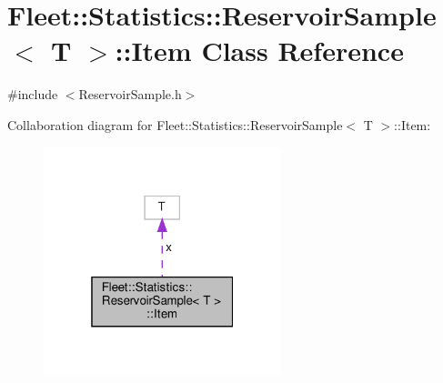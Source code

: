 \hypertarget{class_fleet_1_1_statistics_1_1_reservoir_sample_1_1_item}{}\section{Fleet\+:\+:Statistics\+:\+:Reservoir\+Sample$<$ T $>$\+:\+:Item Class Reference}
\label{class_fleet_1_1_statistics_1_1_reservoir_sample_1_1_item}


{\ttfamily \#include $<$Reservoir\+Sample.\+h$>$}



Collaboration diagram for Fleet\+:\+:Statistics\+:\+:Reservoir\+Sample$<$ T $>$\+:\+:Item\+:\nopagebreak
\begin{figure}[H]
\begin{center}
\leavevmode
\includegraphics[width=196pt]{class_fleet_1_1_statistics_1_1_reservoir_sample_1_1_item__coll__graph}
\end{center}
\end{figure}
